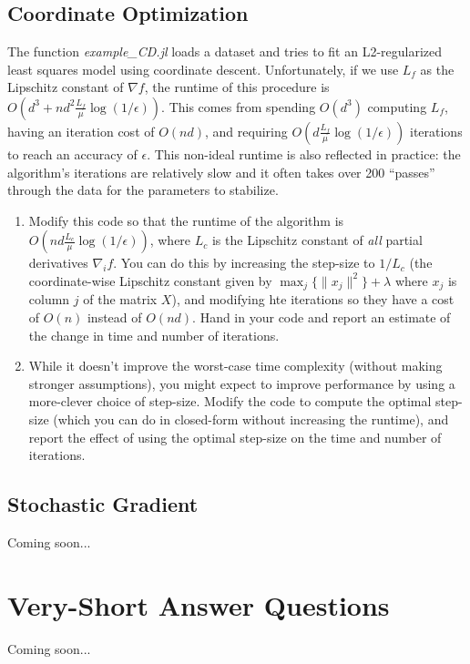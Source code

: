 \documentclass{article}
\def\blu#1{{\color{blu}#1}}
\def\norm#1{\|#1\|}
\def\enum#1{\begin{enumerate}#1\end{enumerate}}
\begin{document}
\subsection{Coordinate Optimization}

The function \emph{example\_CD.jl} loads a dataset and tries to fit an L2-regularized least squares model using coordinate descent. Unfortunately, if we use $L_f$ as the Lipschitz constant of $\nabla f$, the runtime of this procedure is $O(d^3 + nd^2\frac{L_f}{\mu}\log(1/\epsilon))$. This comes from spending $O(d^3)$ computing $L_f$, having an iteration cost of $O(nd)$, and requiring $O(d\frac{L_f}{\mu}\log(1/\epsilon))$ iterations to reach an accuracy of $\epsilon$. This non-ideal runtime is also reflected in practice: the algorithm's iterations are relatively slow and it often takes over 200 ``passes'' through the data for the parameters to stabilize.

\enum{
\item Modify this code so that the runtime of the algorithm is $O(nd\frac{L_c}{\mu}\log(1/\epsilon))$, where $L_c$ is the Lipschitz constant of \emph{all} partial derivatives $\nabla_i f$. You can do this by increasing the step-size to $1/L_c$ (the coordinate-wise Lipschitz constant given by $\max_j\{\norm{x_j}^2\} + \lambda$ where $x_j$ is column $j$ of the matrix $X$), and modifying hte iterations so they have a cost of $O(n)$ instead of $O(nd)$.
 \blu{Hand in your code and report an estimate of the change in time and number of iterations}.
 \item While it doesn't improve the worst-case time complexity (without making stronger assumptions), you might expect to improve performance by using a more-clever choice of step-size. \blu{Modify the code to compute the optimal step-size (which you can do in closed-form without increasing the runtime), and report the effect of using the optimal step-size on the time and number of iterations.}
}

\subsection{Stochastic Gradient}

Coming soon...


\section{Very-Short Answer Questions}

Coming soon...



 
\end{document}
